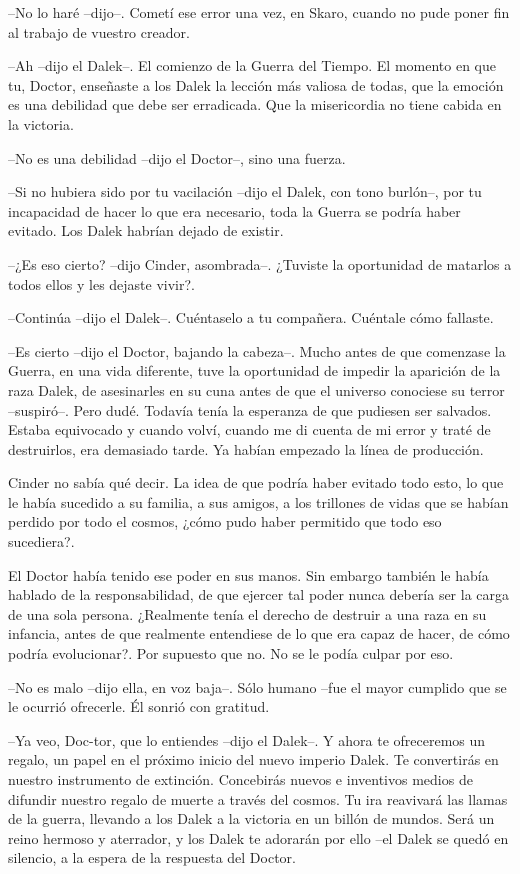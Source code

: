 --No lo haré --dijo--. Cometí ese error una vez, en Skaro, cuando no pude poner fin al trabajo de vuestro creador.

--Ah --dijo el Dalek--. El comienzo de la Guerra del Tiempo. El momento en que tu, Doctor, enseñaste a los Dalek la lección más valiosa de todas, que la emoción es una debilidad que debe ser erradicada. Que la misericordia no tiene cabida en la victoria.

--No es una debilidad --dijo el Doctor--, sino una fuerza.

--Si no hubiera sido por tu vacilación --dijo el Dalek, con tono burlón--, por tu incapacidad de hacer lo que era necesario, toda la Guerra se podría haber evitado. Los Dalek habrían dejado de existir.

--¿Es eso cierto? --dijo Cinder, asombrada--. ¿Tuviste la oportunidad de matarlos a todos ellos y les dejaste vivir?.

--Continúa --dijo el Dalek--. Cuéntaselo a tu compañera. Cuéntale cómo fallaste.

--Es cierto --dijo el Doctor, bajando la cabeza--. Mucho antes de que comenzase la Guerra, en una vida diferente, tuve la oportunidad de impedir la aparición de la raza Dalek, de asesinarles en su cuna antes de que el universo conociese su terror --suspiró--. Pero dudé. Todavía tenía la esperanza de que pudiesen ser salvados. Estaba equivocado y cuando volví, cuando me di cuenta de mi error y traté de destruirlos, era demasiado tarde. Ya habían empezado la línea de producción.



Cinder no sabía qué decir. La idea de que podría haber evitado todo esto, lo que le había sucedido a su familia, a sus amigos, a los trillones de vidas que se habían perdido por todo el cosmos, ¿cómo pudo haber permitido que todo eso sucediera?.

El Doctor había tenido ese poder en sus manos. Sin embargo también le había hablado de la responsabilidad, de que ejercer tal poder nunca debería ser la carga de una sola persona. ¿Realmente tenía el derecho de destruir a una raza en su infancia, antes de que realmente entendiese de lo que era capaz de hacer, de cómo podría evolucionar?. Por supuesto que no. No se le podía culpar por eso. 



--No es malo --dijo ella, en voz baja--. Sólo humano --fue el mayor cumplido que se le ocurrió ofrecerle. Él sonrió con gratitud.

--Ya veo, Doc-tor, que lo entiendes --dijo el Dalek--. Y ahora te ofreceremos un regalo, un papel en el próximo inicio del nuevo imperio Dalek. Te convertirás en nuestro instrumento de extinción. Concebirás nuevos e inventivos medios de difundir nuestro regalo de muerte a través del cosmos. Tu ira reavivará las llamas de la guerra, llevando a los Dalek a la victoria en un billón de mundos. Será un reino hermoso y aterrador, y los Dalek te adorarán por ello --el Dalek se quedó en silencio, a la espera de la respuesta del Doctor.

